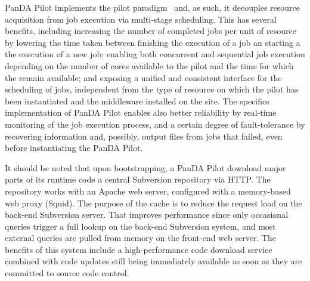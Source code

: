 
PanDA Pilot implements the pilot paradigm~\cite{pilot_review} and, as such, it
decouples resource acquisition from job execution via multi-stage scheduling.
This has several benefits, including increasing the number of completed jobs per
unit of resource by lowering the time taken between finishing the execution of a
job an starting a the execution of a new job; enabling both concurrent and
sequential job execution depending on the number of cores available to the pilot
and the time for which the remain available; and exposing a unified and
consistent interface for the scheduling of jobs, independent from the type of
resource on which the pilot has been instantiated and the middleware installed
on the site. The specifics implementation of PanDA Pilot enables also better
reliability by real-time monitoring of the job execution process, and a certain
degree of fault-tolerance by recovering information and, possibly, output files
from jobs that failed, even before instantiating the PanDA Pilot.


It should be noted that upon bootstrapping, a PanDA Pilot download major parts
of its runtime code a central Subversion repository via HTTP. The repository
works with an Apache web server, configured with a memory-based web proxy
(Squid). The purpose of the cache is to reduce the request load on the
back-end Subversion server. That improves performance  since only occasional queries trigger a full lookup on the
back-end Subversion system, and most external queries are pulled from memory
on the front-end web server. The benefits of this system include a
high-performance code download service combined with code updates still being
immediately available as soon as they are committed to source code control.

